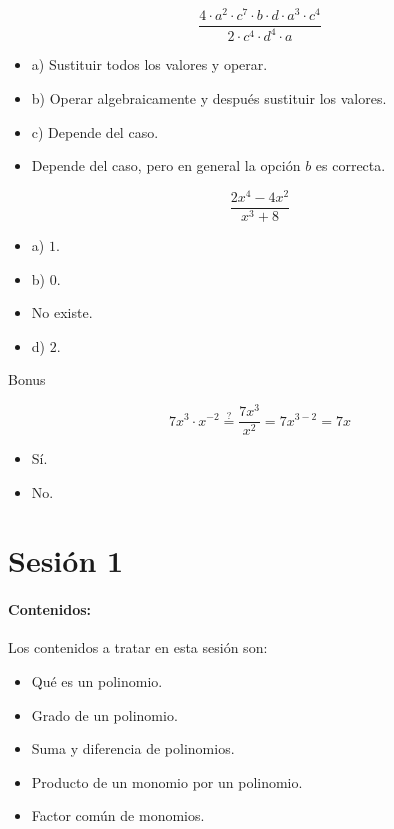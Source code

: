\[
	\frac{4·a^2·c^7·b·d·a^3·c^4}{2·c^4·d^4·a}
\]

\begin{itemize}
	\item a) Sustituir todos los valores y operar.
	\item b) Operar algebraicamente y después sustituir los valores.
	\item c) Depende del caso.
	\item {} Depende del caso, pero en general la opción $b$ es correcta.
\end{itemize}

\[
	\frac{2x^4-4x^2}{x^3+8}
\]

\begin{itemize}
	\item a) $1$.
	\item b) $0$.
	\item {} No existe.
	\item d) $2$.
\end{itemize}



\newbloq Bonus

\[
	7x^3·x^{-2} \overset{?}{=} \frac{7x^3}{x^2} = 7x^{3-2} = 7x
\]

\begin{itemize}
	\item {} Sí.
	\item No.
\end{itemize}




\section{Sesión 1}


\paragraph{Contenidos:}
Los contenidos a tratar en esta sesión son:
\begin{itemize}
\item Qué es un polinomio.
\item Grado de un polinomio.
\item Suma y diferencia de polinomios.
\item Producto de un monomio por un polinomio.
\item Factor común de monomios.
\end{itemize}

